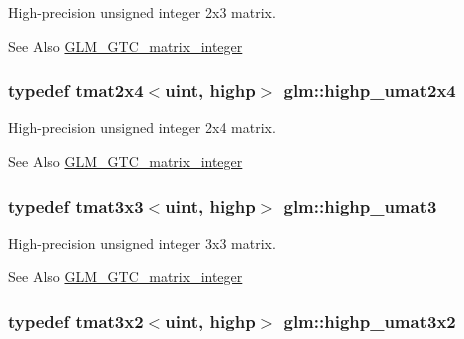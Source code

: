 High-\/precision unsigned integer 2x3 matrix. \begin{DoxySeeAlso}{See Also}
\hyperlink{group__gtc__matrix__integer}{G\-L\-M\-\_\-\-G\-T\-C\-\_\-matrix\-\_\-integer} 
\end{DoxySeeAlso}
\hypertarget{group__gtc__matrix__integer_gafcec07e857ea0445d93680411e86482c}{
\subsubsection[{highp\-\_\-umat2x4}]{\setlength{\rightskip}{0pt plus 5cm}typedef tmat2x4$<$uint, highp$>$ {\bf glm\-::highp\-\_\-umat2x4}}}\label{group__gtc__matrix__integer_gafcec07e857ea0445d93680411e86482c}
High-\/precision unsigned integer 2x4 matrix. \begin{DoxySeeAlso}{See Also}
\hyperlink{group__gtc__matrix__integer}{G\-L\-M\-\_\-\-G\-T\-C\-\_\-matrix\-\_\-integer} 
\end{DoxySeeAlso}
\hypertarget{group__gtc__matrix__integer_ga58bc8d0aeac88af0d38723b5cfa4fa67}{
\subsubsection[{highp\-\_\-umat3}]{\setlength{\rightskip}{0pt plus 5cm}typedef tmat3x3$<$uint, highp$>$ {\bf glm\-::highp\-\_\-umat3}}}\label{group__gtc__matrix__integer_ga58bc8d0aeac88af0d38723b5cfa4fa67}
High-\/precision unsigned integer 3x3 matrix. \begin{DoxySeeAlso}{See Also}
\hyperlink{group__gtc__matrix__integer}{G\-L\-M\-\_\-\-G\-T\-C\-\_\-matrix\-\_\-integer} 
\end{DoxySeeAlso}
\hypertarget{group__gtc__matrix__integer_ga7484178233773045088b42f362dade86}{
\subsubsection[{highp\-\_\-umat3x2}]{\setlength{\rightskip}{0pt plus 5cm}typedef tmat3x2$<$uint, highp$>$ {\bf glm\-::highp\-\_\-umat3x2}}}\label{group__gtc__matrix__integer_ga7484178233773045088b42f362dade86}
